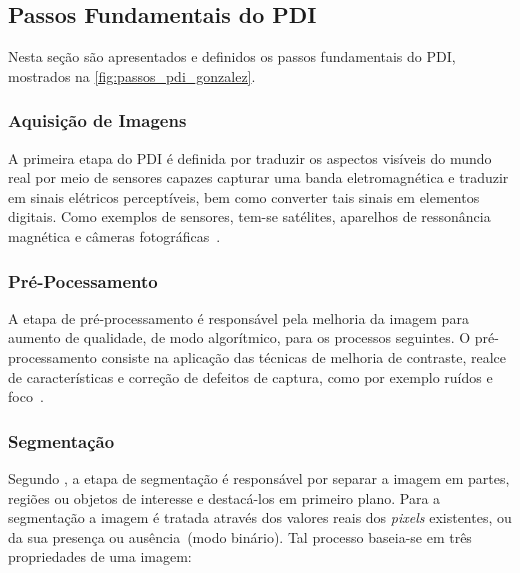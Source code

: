\documentclass[12pt,oneside,a4paper,chapter=TITLE,section=TITLE,sumario=tradicional]{abntex2}
\begin{document}
\subsection{Passos Fundamentais do PDI}

Nesta seção são apresentados e definidos os passos fundamentais do PDI, mostrados na \autoref{fig:passos_pdi_gonzalez}.

\begin{figure}[htb]
\end{figure}

\subsubsection{Aquisição de Imagens}

A primeira etapa do PDI é definida por traduzir os aspectos visíveis do mundo real por meio de sensores capazes capturar uma banda eletromagnética e traduzir em sinais elétricos perceptíveis, bem como converter tais sinais em elementos digitais. Como exemplos de sensores, tem-se satélites, aparelhos de ressonância magnética e câmeras fotográficas~\cite[p.7–10]{pdi2006}.

\subsubsection{Pré-Pocessamento}

A etapa de pré-processamento é responsável pela melhoria da imagem para aumento de qualidade, de modo algorítmico, para os processos seguintes. O pré-processamento consiste na aplicação das técnicas de melhoria de contraste, realce de características e correção de defeitos de captura, como por exemplo ruídos e foco~\cite[p.6]{pdi2006}.

\subsubsection{Segmentação}

Segundo , a etapa de segmentação é responsável por separar a imagem em partes, regiões ou objetos de interesse e destacá-los em primeiro plano. Para a segmentação a imagem é tratada através dos valores reais dos \textit{pixels} existentes, ou da sua presença ou ausência~(modo binário). Tal processo baseia-se em três propriedades de uma imagem\cite[p.236-237]{solomon2000fundamentos}:
\end{document}

